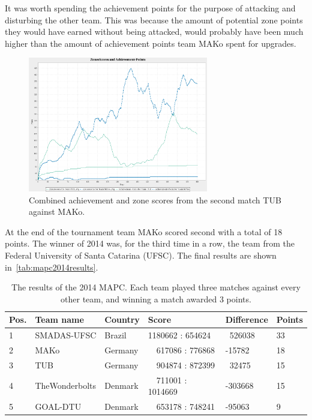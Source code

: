 It was worth spending the achievement points for the purpose of attacking and disturbing the other team.
This was because the amount of potential zone points they would have earned without being attacked, would probably have been much higher than the amount of achievement points team MAKo spent for upgrades.
\begin{figure}[h]
	\centering
	\includegraphics[width=0.7\textwidth]{images/ZonesScoresAndAchievementPoints.png}
	\caption{Combined achievement and zone scores from the second match TUB against MAKo.} %
	\label{dis:ZonesScoresAndAchievementPoints}
\end{figure}
At the end of the tournament team MAKo scored second with a total of 18 points.
The winner of 2014 was, for the third time in a row, the team from the Federal University of Santa Catarina (UFSC).
The final results are shown in~\autoref{tab:mapc2014results}.
\begin{table}[ht]
  \centering
  \begin{tabularx}{\textwidth}{| l | X | p{2cm} | X | p{2cm} | l |}
    \hline
    \textbf{Pos.} & \textbf{Team name} & \textbf{Country} & \textbf{Score}       & \textbf{Difference} & \textbf{Points} \\ \hline
    1             & SMADAS-UFSC        & Brazil           & 1180662 : 654624     & \ 526038            & 33              \\
    2             & MAKo               & Germany          & \ \ 617086 : 776868  & -15782              & 18              \\
    3             & TUB                & Germany          & \ \ 904874 : 872399  & \ 32475             & 15              \\
    4             & TheWonderbolts     & Denmark          & \ \ 711001 : 1014669 & -303668             & 15              \\
    5             & GOAL-DTU           & Denmark          & \ \ 653178 : 748241  & -95063              & 9               \\ \hline
  \end{tabularx}
  \caption{The results of the 2014 MAPC. Each team played three matches against every other team, and winning a match awarded 3 points.}
  \label{tab:mapc2014results}
\end{table}

